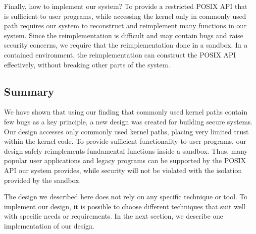 Finally, how to implement our system? 
To provide a restricted POSIX API that is sufficient to user programs, while accessing the kernel only in commonly used path requires our system to 
reconstruct and reimplement many functions in our system. Since the reimplementation is difficult and may contain bugs 
and raise security concerns, we require that the reimplementation done in a sandbox. In a contained 
environment, the reimplementation can construct the POSIX API effectively, without breaking other parts of the system.  

\subsection{Summary}
We have shown that using our finding that commonly used kernel paths contain few bugs as a key principle, a new design was created 
for building secure systems. Our design accesses only commonly used kernel paths, placing very limited trust within the kernel code. 
To provide sufficient functionality to user programs, our design safely reimplements fundamental functions inside a sandbox. Thus, many 
popular user applications and legacy programs can be supported by the POSIX API our system provides, while security will not be violated 
with the isolation provided by the sandbox. 

The design we described here does not rely on any specific technique or tool. To implement our design, it is possible to choose different techniques 
that suit well with specific needs or requirements. In the next section, we describe one implementation of our design. 
